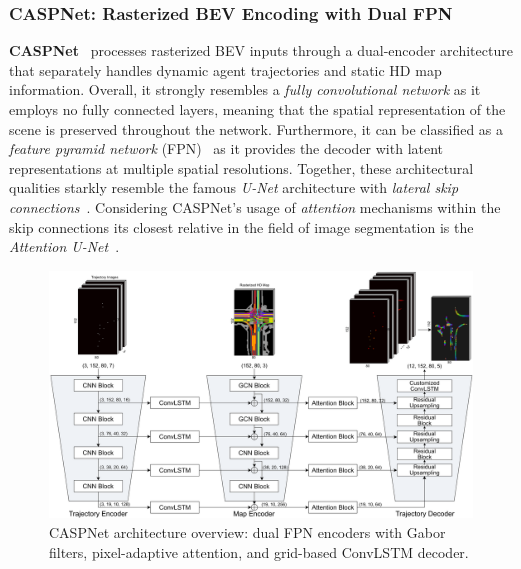 \subsubsection*{CASPNet: Rasterized BEV Encoding with Dual FPN}

\textbf{CASPNet}~\cite{caspnetSchäfer2022} processes rasterized BEV inputs through a dual-encoder architecture that separately handles dynamic agent trajectories and static HD map information. Overall, it strongly resembles a \emph{fully convolutional network} as it employs no fully connected layers, meaning that the spatial representation of the scene is preserved throughout the network. Furthermore, it can be classified as a \emph{feature pyramid network} (FPN)~\cite{FPNLin2017} as it provides the decoder with latent representations at multiple spatial resolutions. Together, these architectural qualities starkly resemble the famous \emph{U-Net} architecture with \emph{lateral skip connections}~\cite{UNetLSRonneberger2015}. Considering CASPNet's usage of \emph{attention} mechanisms within the skip connections its closest relative in the field of image segmentation is the \emph{Attention U-Net}~\cite{AttentionUNetOktay2018}.

\begin{figure}[ht]
  \centering
  \includegraphics[width=\linewidth]{figures/caspnet_arch.png}
  \caption{CASPNet architecture overview: dual FPN encoders with Gabor filters, pixel-adaptive attention, and grid-based ConvLSTM decoder.}
  \label{fig:caspnet_overview}
\end{figure}

